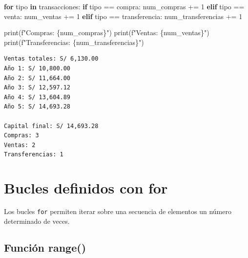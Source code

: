 \documentclass[
  doc,
  floatsintext,
  longtable,
  a4paper,
  nolmodern,
  notxfonts,
  notimes,
  12pt,
  colorlinks=true,linkcolor=blue,citecolor=blue,urlcolor=blue]{apa7}
\newenvironment{Shaded}{\begin{snugshade}}{\end{snugshade}}
\newcommand{\BuiltInTok}[1]{\textcolor[rgb]{0.00,0.23,0.31}{#1}}
\newcommand{\ControlFlowTok}[1]{\textcolor[rgb]{0.00,0.23,0.31}{\textbf{#1}}}
\newcommand{\DecValTok}[1]{\textcolor[rgb]{0.68,0.00,0.00}{#1}}
\newcommand{\KeywordTok}[1]{\textcolor[rgb]{0.00,0.23,0.31}{\textbf{#1}}}
\newcommand{\NormalTok}[1]{\textcolor[rgb]{0.00,0.23,0.31}{#1}}
\newcommand{\OperatorTok}[1]{\textcolor[rgb]{0.37,0.37,0.37}{#1}}
\newcommand{\SpecialCharTok}[1]{\textcolor[rgb]{0.37,0.37,0.37}{#1}}
\newcommand{\SpecialStringTok}[1]{\textcolor[rgb]{0.13,0.47,0.30}{#1}}
\newcommand{\StringTok}[1]{\textcolor[rgb]{0.13,0.47,0.30}{#1}}
\begin{document}
\begin{Shaded}
\begin{Highlighting}[]
\ControlFlowTok{for}\NormalTok{ tipo }\KeywordTok{in}\NormalTok{ transacciones:}
    \ControlFlowTok{if}\NormalTok{ tipo }\OperatorTok{==} \StringTok{\textquotesingle{}compra\textquotesingle{}}\NormalTok{:}
\NormalTok{        num\_compras }\OperatorTok{+=} \DecValTok{1}
    \ControlFlowTok{elif}\NormalTok{ tipo }\OperatorTok{==} \StringTok{\textquotesingle{}venta\textquotesingle{}}\NormalTok{:}
\NormalTok{        num\_ventas }\OperatorTok{+=} \DecValTok{1}
    \ControlFlowTok{elif}\NormalTok{ tipo }\OperatorTok{==} \StringTok{\textquotesingle{}transferencia\textquotesingle{}}\NormalTok{:}
\NormalTok{        num\_transferencias }\OperatorTok{+=} \DecValTok{1}

\BuiltInTok{print}\NormalTok{(}\SpecialStringTok{f"Compras: }\SpecialCharTok{\{}\NormalTok{num\_compras}\SpecialCharTok{\}}\SpecialStringTok{"}\NormalTok{)}
\BuiltInTok{print}\NormalTok{(}\SpecialStringTok{f"Ventas: }\SpecialCharTok{\{}\NormalTok{num\_ventas}\SpecialCharTok{\}}\SpecialStringTok{"}\NormalTok{)}
\BuiltInTok{print}\NormalTok{(}\SpecialStringTok{f"Transferencias: }\SpecialCharTok{\{}\NormalTok{num\_transferencias}\SpecialCharTok{\}}\SpecialStringTok{"}\NormalTok{)}
\end{Highlighting}
\end{Shaded}

\begin{verbatim}
Ventas totales: S/ 6,130.00
Año 1: S/ 10,800.00
Año 2: S/ 11,664.00
Año 3: S/ 12,597.12
Año 4: S/ 13,604.89
Año 5: S/ 14,693.28

Capital final: S/ 14,693.28
Compras: 3
Ventas: 2
Transferencias: 1
\end{verbatim}

\section{Bucles definidos con for}\label{bucles-definidos-con-for}

Los bucles \texttt{for} permiten iterar sobre una secuencia de elementos
un número determinado de veces.

\subsection{Función range()}\label{funciuxf3n-range}
\end{document}
